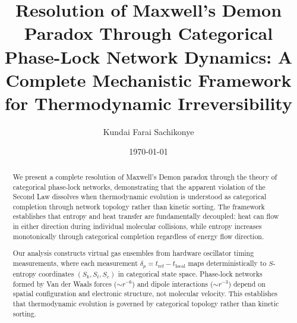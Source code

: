\documentclass[twocolumn,showpacs,preprintnumbers,amsmath,amssymb,prd]{revtex4-2}
\theoremstyle{definition}
\theoremstyle{remark}
\newcommand{\Sk}{S_k}
\newcommand{\St}{S_t}
\newcommand{\Se}{S_e}
\begin{document}

\title{Resolution of Maxwell's Demon Paradox Through Categorical Phase-Lock Network Dynamics: A Complete Mechanistic Framework for Thermodynamic Irreversibility}

\author{Kundai Farai Sachikonye}

\date{\today}

\begin{abstract}
We present a complete resolution of Maxwell's Demon paradox through the theory of categorical phase-lock networks, demonstrating that the apparent violation of the Second Law dissolves when thermodynamic evolution is understood as categorical completion through network topology rather than kinetic sorting. The framework establishes that entropy and heat transfer are fundamentally decoupled: heat can flow in either direction during individual molecular collisions, while entropy increases monotonically through categorical completion regardless of energy flow direction.

Our analysis constructs virtual gas ensembles from hardware oscillator timing measurements, where each measurement $\delta_p = t_{\text{ref}} - t_{\text{local}}$ maps deterministically to $S$-entropy coordinates $(\Sk, \St, \Se)$ in categorical state space. Phase-lock networks formed by Van der Waals forces ($\sim r^{-6}$) and dipole interactions ($\sim r^{-3}$) depend on spatial configuration and electronic structure, not molecular velocity. This establishes that thermodynamic evolution is governed by categorical topology rather than kinetic sorting.


\end{abstract}
\end{document}

